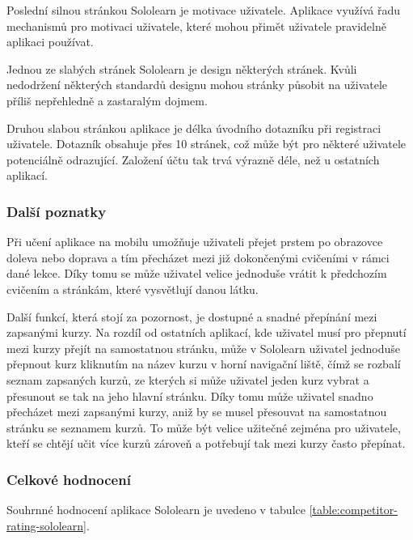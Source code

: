 Poslední silnou stránkou Sololearn je motivace uživatele. Aplikace využívá řadu mechanismů pro motivaci uživatele, které mohou přimět uživatele pravidelně aplikaci používat. 

Jednou ze slabých stránek Sololearn je design některých stránek. Kvůli nedodržení některých standardů designu mohou stránky působit na uživatele příliš nepřehledně a zastaralým dojmem.

Druhou slabou stránkou aplikace je délka úvodního dotazníku při registraci uživatele. Dotazník obsahuje přes 10 stránek, což může být pro některé uživatele potenciálně odrazující. Založení účtu tak trvá výrazně déle, než u ostatních aplikací. 

\subsubsection{Další poznatky}


Při učení aplikace na mobilu umožňuje uživateli přejet prstem po obrazovce doleva nebo doprava a tím přecházet mezi již dokončenými cvičeními v rámci dané lekce. Díky tomu se může uživatel velice jednoduše vrátit k předchozím cvičením a stránkám, které vysvětlují danou látku.

Další funkcí, která stojí za pozornost, je dostupné a snadné přepínání mezi zapsanými kurzy. Na rozdíl od ostatních aplikací, kde uživatel musí pro přepnutí mezi kurzy přejít na samostatnou stránku, může v Sololearn uživatel jednoduše přepnout kurz kliknutím na název kurzu v horní navigační liště, čímž se rozbalí seznam zapsaných kurzů, ze kterých si může uživatel jeden kurz vybrat a přesunout se tak na jeho hlavní stránku. Díky tomu může uživatel snadno přecházet mezi zapsanými kurzy, aniž by se musel přesouvat na samostatnou stránku se seznamem kurzů. To může být velice užitečné zejména pro uživatele, kteří se chtějí učit více kurzů zároveň a potřebují tak mezi kurzy často přepínat.

\subsubsection{Celkové hodnocení}

Souhrnné hodnocení aplikace Sololearn je uvedeno v tabulce \ref{table:competitor-rating-sololearn}.

